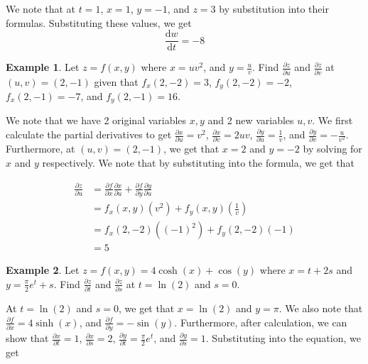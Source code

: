 \documentclass[11pt]{article}
\theoremstyle{plain} %
\theoremstyle{definition}
\theoremstyle{example}
\newtheorem*{example}{Example}
\theoremstyle{remark}
\begin{document}
We note that at $t=1$, $x=1$, $y=-1$, and $z=3$ by substitution into their formulas. Substituting these values, we get $$\frac{\mathrm d w}{\mathrm d t}=-8$$

\begin{example}
Let $z=f(x,y)$ where $x=uv^2$, and $y=\frac{u}{v}$. Find $\frac{\partial z}{\partial u}$ and $\frac{\partial z}{\partial v}$ at $(u,v) = (2, -1)$ given that $f_x(2, -2)=3$, $f_y(2, -2) = -2$, $f_x(2, -1)=-7$, and $f_y(2, -1)=16$.
\end{example}

We note that we have 2 original variables $x, y$ and 2 new variables $u, v$. We first calculate the partial derivatives to get $\frac{\partial x}{\partial u}=v^2$, $\frac{\partial x}{\partial v}=2uv$, $\frac{\partial y}{\partial u}=\frac{1}{v}$, and $\frac{\partial y}{\partial v}=-\frac{u}{v^2}$. Furthermore, at $(u, v) = (2, -1)$, we get that $x=2$ and $y=-2$ by solving for $x$ and $y$ respectively. We note that by substituting into the formula, we get that 

\begin{align*}
	\frac{\partial z}{\partial u} &= \frac{\partial f}{\partial x}\frac{\partial x}{\partial u}+\frac{\partial f}{\partial y}\frac{\partial y}{\partial u}\\
	&=f_x(x,y)\left(v^2\right)+f_y(x,y)\left(\frac{1}{v}\right)\\
	&=f_x(2,-2)\left((-1)^2\right)+f_y(2,-2)\left(-1\right)\\
	&= 5
\end{align*}

\begin{example}
Let $z=f(x,y)=4\cosh(x)+\cos(y)$ where $x=t+2s$ and $y=\frac{\pi}{2}e^t+s$. Find $\frac{\partial z}{\partial t}$ and $\frac{\partial z}{\partial s}$ at $t=\ln(2)$ and $s=0$.\end{example}

At $t=\ln(2)$ and $s=0$, we get that $x=\ln(2)$ and $y=\pi$. We also note that $\frac{\partial f}{\partial x} = 4\sinh(x)$, and $\frac{\partial f}{\partial y}=-\sin(y)$. Furthermore, after calculation, we can show that $\frac{\partial x}{\partial t}=1$, $\frac{\partial x}{\partial s}=2$, $\frac{\partial y}{\partial t}=\frac{\pi}{2}e^t$, and $\frac{\partial y}{\partial s}=1$. Substituting into the equation, we get
\end{document}
